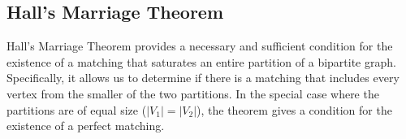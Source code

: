 \begin{comment}
\begin{proof}
    We have the following expression for the determinant, \draft{also called Leibniz formula}:

    $$
    \text{Det}(M) = \sum_{\pi \in S_n} (-1)^{sgn(\pi)} \prod_{i=1}^{n} M_{i,\pi(i)}
    $$
    \alessio{Cosa ritorna sgn? 0 o 1? In caso puoi fargli ritornare -1 e 1 e non ti serve l'esponente.}

    where $S_n$ is the set of all permutations on $[n]$, and $sgn(\pi)$ is the sign of the permutation $\pi$. \alessio{Definisci il segno di una permutazione. Prima indicavi le permutazioni con $\Pi$, ora con $\pi$. Immagino che sia per la moltiplicatoria, valuta se usare $\pi$ anche prima.}
    There is a one-to-one correspondence between a permutation $\pi \in S_n$ and a (possible) perfect matching 

    $$
    \{(u_1, v_{\pi(1)}), (u_2, v_{\pi(2)}), \cdots , (u_n, v_{\pi(n)})\} \text{ in } G.
    $$

    Note that if this perfect matching does not exist in $G$ (i.e., some edge $(u_i, v_{\pi(i)}) \notin E$), then the term corresponding to $\pi$ in the summation is $0$. So we have

    $$
    \text{Det}(M) = \sum_{\pi \in P} (-1)^{sgn(\pi)} \prod_{i=1}^{n} x_{i,\pi(i)}
    $$

    where $P$ is the set of perfect matchings in $G$. This is zero if $P = \emptyset$, i.e., if $G$ has no perfect matching. If $G$ has a perfect matching, there is \draft{at least} a $\pi \in P$ and the term corresponding to $\pi$ is

    $$
    \prod_{i=1}^{n} x_{i,\pi(i)} \neq 0.
    $$

    Additionally, there is no other term in the summation that contains the same set of variables. Therefore, this term is not cancelled by any other term. So in this case, $\text{Det}(M) \neq 0$.
\end{proof}
\end{comment}

\subsection{Hall's Marriage Theorem}
Hall's Marriage Theorem \cite{hall1935representatives} provides a necessary and sufficient condition for the existence of a matching that saturates an entire partition of a bipartite graph. Specifically, it allows us to determine if there is a matching that includes every vertex from the smaller of the two partitions. In the special case where the partitions are of equal size ($|V_1| = |V_2|$), the theorem gives a condition for the existence of a perfect matching.

